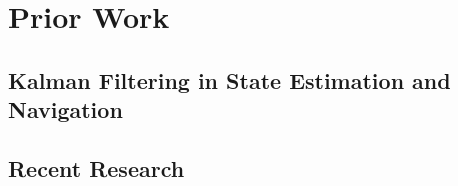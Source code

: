 \chapter{Prior Work}

\section{Kalman Filtering in State Estimation and Navigation}

\section{Recent Research}